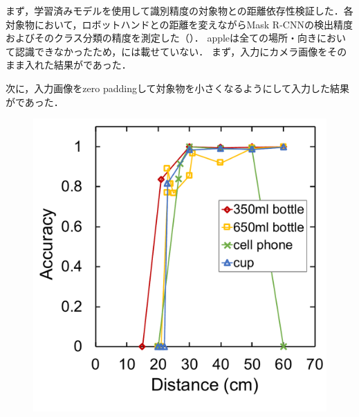 まず，学習済みモデルを使用して識別精度の対象物との距離依存性検証した．各対象物において，ロボットハンドとの距離を変えながらMask R-CNNの検出精度およびそのクラス分類の精度を測定した（）．
appleは全ての場所・向きにおいて認識できなかったため，には載せていない．
まず，入力にカメラ画像をそのまま入れた結果がであった．

次に，入力画像をzero paddingして対象物を小さくなるようにして入力した結果がであった．

\begin{figure}[H]
    \centering
    \begin{minipage}{0.45\columnwidth}
        \centering
        \includegraphics[width=0.95\linewidth]{figure/chapter4/mrcnn_depth}
        \label{fig:mrcnn距離そのまま}
    \end{minipage}
    \begin{minipage}{0.45\columnwidth}
        \centering

\end{minipage}
\end{figure}
